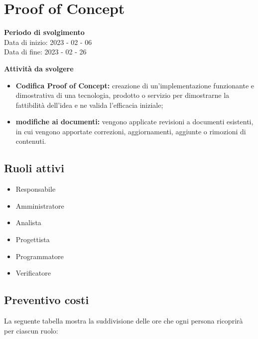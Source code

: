 \section{Proof of Concept}

\textbf{Periodo di svolgimento}
\\ Data di inizio: 2023 - 02 - 06 \\ Data di fine: 2023 - 02 - 26

\textbf{Attività da svolgere}
    \begin{itemize}
        \item \textbf{Codifica Proof of Concept:} creazione di un'implementazione funzionante e dimostrativa di una tecnologia, prodotto o servizio per dimostrarne la fattibilità dell'idea e ne valida l'efficacia iniziale; 
        \item \textbf{modifiche ai documenti:} vengono applicate revisioni a documenti esistenti, in cui vengono apportate correzioni, aggiornamenti, aggiunte o rimozioni di contenuti.
    \end{itemize}

\subsection{Ruoli attivi}
\begin{itemize}
    \item Responsabile 
    \item Amministratore 
    \item Analista 
    \item Progettista 
    \item Programmatore 
    \item Verificatore 
\end{itemize}

\subsection{Preventivo costi}

La seguente tabella mostra la suddivisione delle ore che ogni persona ricoprirà per ciascun ruolo:

